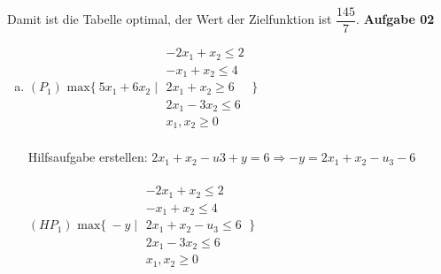 \documentclass[a4paper,10pt]{article}
\begin{document}
	Damit ist die Tabelle optimal, der Wert der Zielfunktion ist $\dfrac{145}{7}$.
	\newpage
	\textbf{Aufgabe 02}\\
	\begin{enumerate}[a)]
		\item 
		$ (P_1) \text{ max} \{\ 5x_1 + 6x_2 \mid \begin{matrix}
		-2x_1 + x_2 \leq 2\\
		-x_1 + x_2 \leq 4\\
		2x_1 + x_2 \geq 6\\
		2x_1 - 3x_2 \leq 6\\
		x_1, x_2 \geq 0
		\end{matrix}
		\ \} $\\\\
		Hilfsaufgabe erstellen: $2x_1 + x_2 -u3 + y = 6 \Rightarrow -y = 2x_1 + x_2 -u_3 - 6$\\\\
		$ (HP_1) \text{ max} \{\ -y \mid \begin{matrix}
		-2x_1 + x_2 \leq 2\\
		-x_1 + x_2 \leq 4\\
		2x_1 + x_2 -u_3 \leq 6\\
		2x_1 - 3x_2 \leq 6\\
		x_1, x_2 \geq 0
		\end{matrix}
		\ \} $
		

\end{enumerate}
\end{document}
